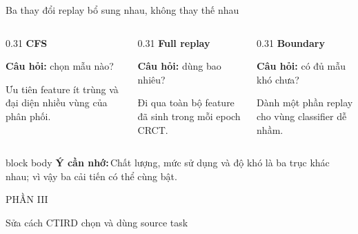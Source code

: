 \documentclass[aspectratio=169,10pt]{beamer}
\newcommand{\remember}[1]{%
  \par\vspace{0.12cm}%
  \begin{beamercolorbox}[wd=\linewidth,sep=0.11cm,leftskip=0.08cm,rightskip=0.08cm,rounded=true]{block body}
    \footnotesize\textbf{\color{HRMBlue}Ý cần nhớ:}\,\color{HRMDark}#1
  \end{beamercolorbox}
}
\newcommand{\sectionframe}[2]{%
  \begin{frame}[plain]
    \vfill
    {\large\color{HRMBlue}#1}\par\vspace{0.35cm}
    {\Huge\color{HRMDark}#2}\par
    \vfill
  \end{frame}
}
\begin{document}
\begin{frame}{Ba thay đổi replay bổ sung nhau, không thay thế nhau}
  \begin{columns}[T,onlytextwidth]
    \begin{column}{0.31\textwidth}
      {\Large\bfseries CFS}\par\vspace{0.2cm}
      \textbf{Câu hỏi:} chọn mẫu nào?\par\vspace{0.2cm}
      Ưu tiên feature ít trùng và đại diện nhiều vùng của phân phối.
    \end{column}
    \begin{column}{0.31\textwidth}
      {\Large\bfseries Full replay}\par\vspace{0.2cm}
      \textbf{Câu hỏi:} dùng bao nhiêu?\par\vspace{0.2cm}
      Đi qua toàn bộ feature đã sinh trong mỗi epoch CRCT.
    \end{column}
    \begin{column}{0.31\textwidth}
      {\Large\bfseries Boundary}\par\vspace{0.2cm}
      \textbf{Câu hỏi:} có đủ mẫu khó chưa?\par\vspace{0.2cm}
      Dành một phần replay cho vùng classifier dễ nhầm.
    \end{column}
  \end{columns}
  \remember{Chất lượng, mức sử dụng và độ khó là ba trục khác nhau; vì vậy ba cải tiến có thể cùng bật.}
\end{frame}

\sectionframe{PHẦN III}{Sửa cách CTIRD chọn và dùng source task}
\end{document}
